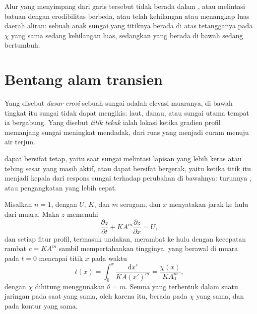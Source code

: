 Alur yang menyimpang dari garis tersebut tidak berada dalam , atau melintasi
batuan dengan erodibilitas berbeda, atau telah kehilangan atau menangkap luas daerah aliran: sebuah
anak sungai yang titiknya berada di atas tetangganya pada $\chi$ yang sama sedang
kehilangan luas, sedangkan yang berada di bawah sedang bertumbuh.

\section{Bentang alam transien}\label{sec:b3:quantitative-geomorphology:transient}

\begin{definition}\label{def:b3:quantitative-geomorphology:knickpoint}
Yang disebut \emph{dasar erosi} sebuah sungai adalah elevasi muaranya,
di bawah tingkat itu sungai tidak dapat mengikis: laut, danau, atau sungai utama tempat ia
bergabung. Yang disebut \emph{titik tekuk} ialah lokasi ketika gradien
profil memanjang sungai meningkat mendadak, dari ruas yang menjadi curam
menuju air terjun.
\end{definition}

 dapat bersifat tetap, yaitu saat sungai melintasi lapisan yang lebih keras atau
tebing sesar yang masih aktif, atau dapat bersifat bergerak, yaitu ketika titik itu menjadi kepala dari
respons sungai terhadap perubahan di bawahnya: turunnya , atau
pengangkatan yang lebih cepat.

\begin{theorem}\label{thm:b3:quantitative-geomorphology:kinematic}
Misalkan $n = 1$, dengan $U$, $K$, dan $m$ seragam, dan $x$ menyatakan jarak
ke hulu dari muara. Maka $z$ memenuhi
\[
\frac{\partial z}{\partial t} + K A^m \frac{\partial z}{\partial x} = U ,
\]
dan setiap fitur profil, termasuk undakan, merambat ke hulu dengan
kecepatan rambat $c = K A^m$ sambil mempertahankan tingginya.  yang
berawal di muara pada $t = 0$ mencapai titik $x$ pada waktu
\[
t(x) = \int_0^x \frac{\mathrm{d}x'}{K A(x')^m} = \frac{\chi(x)}{K A_0^m},
\]
dengan $\chi$ dihitung menggunakan $\theta = m$. Semua  yang terbentuk dalam suatu jaringan
pada saat yang sama, oleh karena itu, berada pada $\chi$ yang sama, dan pada kontur yang sama.
\end{theorem}

